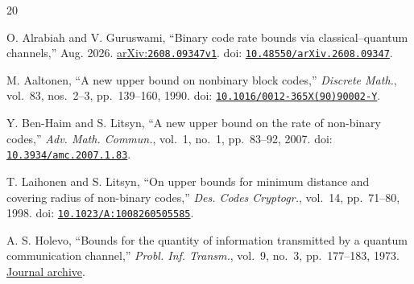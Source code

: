 \documentclass[12pt,letterpaper,onecolumn]{article}
\newcommand{\doi}[1]{\href{https://doi.org/#1}{\nolinkurl{#1}}}
\newcommand{\arxiv}[1]{\href{https://arxiv.org/abs/#1}{arXiv:\nolinkurl{#1}}}
\theoremstyle{definition}
\theoremstyle{remark}
\begin{document}
\begin{thebibliography}{20}


O. Alrabiah and V. Guruswami, ``Binary code rate bounds via classical--quantum channels,'' Aug. 2026. \arxiv{2608.09347v1}. doi: \doi{10.48550/arXiv.2608.09347}.

M. Aaltonen, ``A new upper bound on nonbinary block codes,'' \emph{Discrete Math.}, vol.~83, nos.~2--3, pp.~139--160, 1990. doi: \doi{10.1016/0012-365X(90)90002-Y}.

Y. Ben-Haim and S. Litsyn, ``A new upper bound on the rate of non-binary codes,'' \emph{Adv. Math. Commun.}, vol.~1, no.~1, pp.~83--92, 2007. doi: \doi{10.3934/amc.2007.1.83}.

T. Laihonen and S. Litsyn, ``On upper bounds for minimum distance and covering radius of non-binary codes,'' \emph{Des. Codes Cryptogr.}, vol.~14, pp.~71--80, 1998. doi: \doi{10.1023/A:1008260505585}.

A. S. Holevo, ``Bounds for the quantity of information transmitted by a quantum communication channel,'' \emph{Probl. Inf. Transm.}, vol.~9, no.~3, pp.~177--183, 1973. \href{https://www.mathnet.ru/eng/ppi903}{Journal archive}.
\end{thebibliography}
\end{document}
